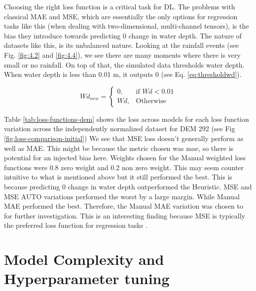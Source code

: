 Choosing the right loss function is a critical task for DL. The problems with classical MAE and MSE, which are essentially the only options for regression tasks like this (when dealing with two-dimensional, multi-channel tensors), is the bias they introduce towards predicting 0 change in water depth. The nature of datasets like this, is its unbalanced nature. Looking at the rainfall events (see Fig. \ref{fig:4.2} and \ref{fig:4.4}), we see there are many moments where there is very small or no rainfall. On top of that, the simulated data thresholds water depth. When water depth is less than 0.01 m, it outputs 0 (see Eq. \ref{eq:thresholdwd}).

\begin{equation}
	\label{eq:thresholdwd}
	Wd_{new} = \begin{cases}
		0, & \text{if } Wd < 0.01 \\
		Wd, & \text{Otherwise}
	\end{cases}
\end{equation}

Table \ref{tab:loss-functions-dem} shows the loss across models for each loss function variation across the independently normalized dataset for DEM 292 (see Fig \ref{fig:loss-comparison-initial}) We see that MSE loss doesn't generally perform as well as MAE. This might be because the metric chosen was mae, so there is potential for an injected bias here. Weights chosen for the  Manual weighted loss functions were 0.8 zero weight and 0.2 non zero weight. This may seem counter intuitive to what is mentioned above but it still performed the best. This is because predicting 0 change in water depth outperformed the Heuristic. MSE and MSE AUTO variations performed the worst by a large margin. While Manual MAE performed the best. Therefore, the Manual MAE variation was chosen to for further investigation. This is an interesting finding because MSE is typically the preferred loss function for regression tasks \cite{jadon2022comprehensive}.  

\section{Model Complexity and Hyperparameter tuning}

